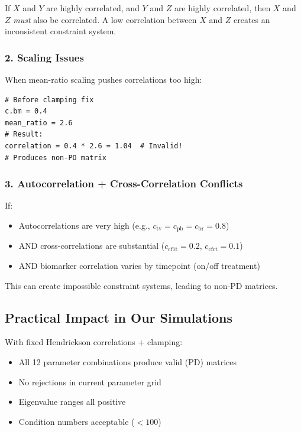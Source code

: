 \documentclass[11pt]{article}
\begin{document}
If $X$ and $Y$ are highly correlated, and $Y$ and $Z$ are highly correlated, then $X$ and $Z$ \emph{must} also be correlated. A low correlation between $X$ and $Z$ creates an inconsistent constraint system.

\subsubsection{2. Scaling Issues}

When mean-ratio scaling pushes correlations too high:

\begin{lstlisting}[style=Rstyle]
# Before clamping fix
c.bm = 0.4
mean_ratio = 2.6
# Result:
correlation = 0.4 * 2.6 = 1.04  # Invalid!
# Produces non-PD matrix
\end{lstlisting}

\subsubsection{3. Autocorrelation + Cross-Correlation Conflicts}

If:
\begin{itemize}
    \item Autocorrelations are very high (e.g., $c_{\text{tv}} = c_{\text{pb}} = c_{\text{br}} = 0.8$)
    \item AND cross-correlations are substantial ($c_{\text{cf1t}} = 0.2$, $c_{\text{cfct}} = 0.1$)
    \item AND biomarker correlation varies by timepoint (on/off treatment)
\end{itemize}

This can create impossible constraint systems, leading to non-PD matrices.

\subsection{Practical Impact in Our Simulations}

With fixed Hendrickson correlations + clamping:
\begin{itemize}
    \item[\checkmark] All 12 parameter combinations produce valid (PD) matrices
    \item[\checkmark] No rejections in current parameter grid
    \item[\checkmark] Eigenvalue ranges all positive
    \item[\checkmark] Condition numbers acceptable ($< 100$)
\end{itemize}
\end{document}
